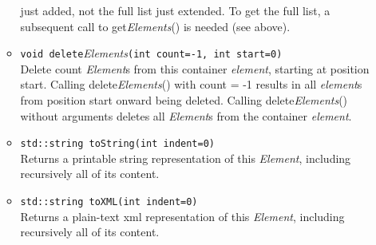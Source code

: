 \documentclass{revtex4}
\begin{document}
\begin{itemize}
\begin{itemize}
just added, not the
full list just extended. To get the full list, a subsequent call to
get{\em Elements}() is needed (see above).
\item \texttt{void delete}{\em Elements}\texttt{(int count=-1, int start=0)}\\
Delete count {\em Element}s from this container {\em element}, starting at
position start. Calling delete{\em Elements}() with count = -1 results in
all {\em element}s from position start onward being deleted. Calling
delete{\em Elements}() without arguments deletes all {\em Element}s
from the container {\em element}.
\item \texttt{std::string toString(int indent=0)}\\
Returns a printable string representation of this {\em Element}, including
recursively all of its content.
\item \texttt{std::string toXML(int indent=0)}\\
Returns a plain-text xml representation of this {\em Element}, including
recursively all of its content.
\end{itemize}


\end{itemize}
\end{document}
